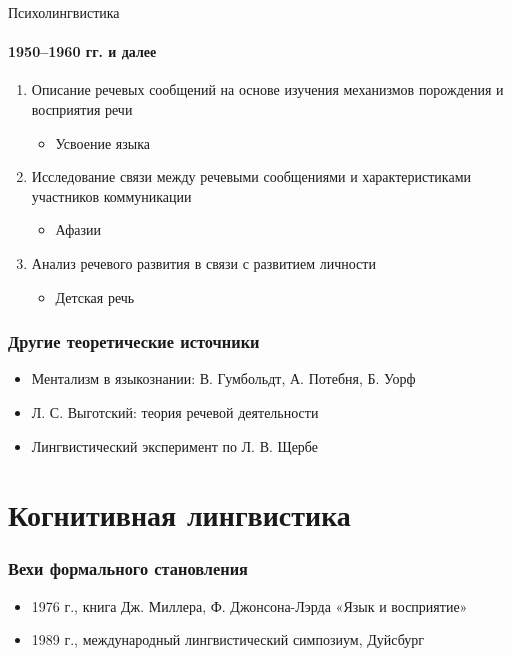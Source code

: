\begin{frame}{Психолингвистика}
  \framesubtitle{1950--1960 гг. и далее}

  \begin{enumerate}
    \item Описание речевых сообщений на основе изучения механизмов порождения и восприятия речи \begin{itemize}
      \item Усвоение языка
    \end{itemize}
    \item Исследование связи между речевыми сообщениями и характеристиками участников коммуникации \begin{itemize}
      \item Афазии
    \end{itemize}
    \item Анализ речевого развития в связи с развитием личности \begin{itemize}
      \item Детская речь
    \end{itemize}
  \end{enumerate}
\end{frame}

\begin{frame}
  \frametitle{Другие теоретические источники}

  \begin{itemize}
    \item Ментализм в языкознании: В. Гумбольдт, А. Потебня, Б. Уорф
    \item Л. С. Выготский: теория речевой деятельности
    \item Лингвистический эксперимент по Л. В. Щербе
  \end{itemize}
\end{frame}

\section{Когнитивная лингвистика}
\frame{\tableofcontents[currentsection]}

\begin{frame}
  \frametitle{Вехи формального становления}

  \begin{itemize}
    \item 1976 г., книга Дж. Миллера, Ф. Джонсона-Лэрда «Язык и восприятие»
    \item 1989 г., международный лингвистический симпозиум, Дуйсбург
  \end{itemize}
\end{frame}

